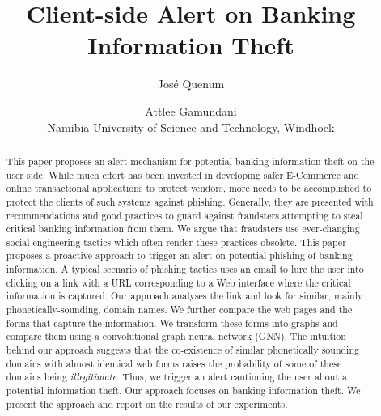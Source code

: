 \documentclass{article}
\title[Phishing Banking Information]{Client-side Alert on Banking Information Theft}
\author[Quenum and Gamundani]{%
  Jos\'{e} Quenum \and Attlee Gamundani\\
Namibia University of Science and Technology, Windhoek\\
\email{jquenum@nust.na\quad agamundani@nust.na}}
\theoremstyle{definition}
\begin{document}
\maketitle

\begin{abstract}
  This paper proposes an alert mechanism for potential banking information theft on the user side. While much effort has been invested in developing safer E-Commerce and online transactional applications to protect vendors, more needs to be accomplished to protect the clients of such systems against phishing. Generally, they are presented with recommendations and good practices to guard against fraudsters attempting to steal critical banking information from them. We argue that fraudsters use ever-changing social engineering tactics which often render these practices obsolete. This paper proposes a proactive approach to trigger an alert on potential phishing of banking information.  A typical scenario of phishing tactics uses an email to lure the user into clicking on a link with a URL corresponding to a Web interface where the critical information is captured. Our approach analyses the link and look for similar, mainly phonetically-sounding,  domain names. We further compare the web pages and the forms that capture the information. We transform these forms into graphs and compare them using a convolutional graph neural network (GNN). The intuition behind our approach suggests that the co-existence of similar phonetically sounding domains with almost identical web forms raises the probability of some of these domains being \emph{illegitimate}. Thus, we trigger an alert cautioning the user about a potential information theft. Our approach focuses on banking information theft. We present the approach and report on the results of our experiments.
\end{abstract}
\end{document}
